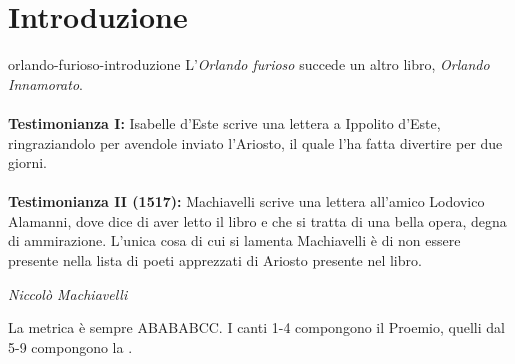 \documentclass[preview]{standalone}
\begin{document}
\genpage

\section{Introduzione}

\begin{snippet}{orlando-furioso-introduzione}
    L'\textit{Orlando furioso} succede un altro libro,
    \textit{Orlando Innamorato}.
    \\\\
    \textbf{Testimonianza I:} Isabelle d'Este scrive una lettera a Ippolito d'Este,
    ringraziandolo per avendole inviato l'Ariosto, il quale l'ha fatta
    divertire per due giorni.
    \\\\
    \textbf{Testimonianza II (1517):}  Machiavelli scrive una lettera all'amico
    Lodovico Alamanni, dove dice di aver letto il libro e
    che si tratta di una bella opera, degna di ammirazione.
    L'unica cosa di cui si lamenta Machiavelli è di non essere presente nella lista di
    poeti apprezzati di Ariosto presente nel libro.
    
    \epigraph{}
    {\textit{Niccolò Machiavelli}}
    
    
    La metrica è sempre ABABABCC.
    I canti 1-4 compongono il Proemio, quelli dal 5-9 compongono la .
\end{snippet}
\end{document}
